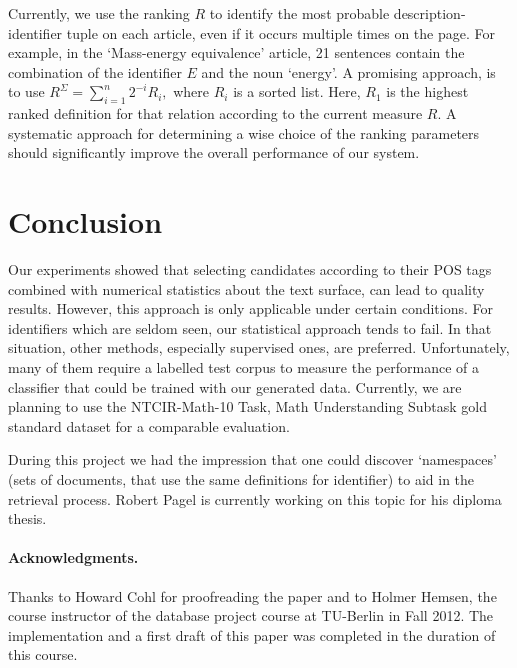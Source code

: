 \documentclass[runningheads]{llncs}
\begin{document}
Currently, we use the ranking $R$ to identify the most probable description-
identifier tuple on each article, even if it occurs multiple times on the page.
For example, in the `Mass-energy equivalence' article, 21 sentences contain the
combination of the identifier $E$ and the noun `energy'. A promising approach,
is to use $R^\Sigma=\sum_{i=1}^n 2^{-i} R_i,$ where $R_i$ is a sorted list.
Here, $R_1$ is the highest ranked definition for that relation according to the
current measure $R$.  A systematic approach for determining a wise choice of the
ranking parameters should significantly improve the overall performance of our
system.


\section{Conclusion}

Our experiments showed that selecting candidates according to their POS tags
combined with numerical statistics about the text surface, can lead to quality
results. However, this approach is only applicable under certain conditions.
For identifiers which are seldom seen, our statistical approach tends to fail.
In that situation, other methods, especially supervised ones, are preferred.
Unfortunately, many of them require a labelled test corpus to measure the
performance of a classifier that could be trained with our generated data.
Currently, we are planning to use the NTCIR-Math-10 Task, Math Understanding
Subtask gold standard dataset \cite{overview} for a comparable evaluation.

During this project we had the impression that one could discover `namespaces'
(sets of documents, that use the same definitions for identifier) to aid in
the retrieval process. Robert Pagel is currently working on this topic
for his diploma thesis.


\paragraph*{Acknowledgments.}

Thanks to Howard Cohl for proofreading the paper and to Holmer Hemsen, the
course instructor of the database project course at TU-Berlin in Fall 2012.
The implementation and a first draft of this paper was completed in the
duration of this course.


\let\oldclearpage\clearpage
\let\clearpage\relax
\vspace{10 mm}

\let\clearpage\oldclearpage


\end{document}
